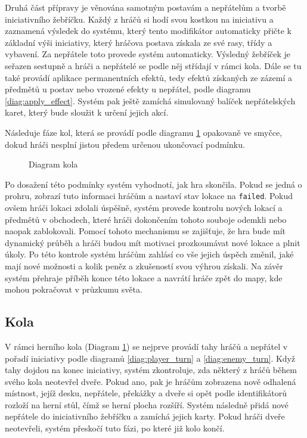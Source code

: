 Druhá část přípravy je věnována samotným postavám a nepřátelům a tvorbě iniciativního žebříčku. Každý z hráčů si hodí svou kostkou na iniciativu a zaznamená výsledek do systému, který tento modifikátor automaticky přičte k základní výši iniciativy, který hráčova postava získala ze své rasy, třídy a vybavení. Za nepřátele toto provede systém automaticky. Výsledný žebříček je seřazen sestupně a hráči a nepřátelé se podle něj střídají v rámci kola. Dále se tu také provádí aplikace permanentních efektů, tedy efektů získaných ze zázemí a předmětů u postav nebo vrozené efekty u nepřátel, podle diagramu \ref{diag:apply_effect}. Systém pak ještě zamíchá simulovaný balíček nepřátelských karet, který bude sloužit k určení jejich akcí.

Následuje fáze kol, která se provádí podle diagramu \ref{diag:round} opakovaně ve smyčce, dokud hráči nesplní jistou předem určenou ukončovací podmínku.

\begin{figure}[h]
    \centering
    \caption{Diagram kola}
    \label{diag:round}
\end{figure}

Po dosažení této podmínky systém vyhodnotí, jak hra skončila. Pokud se jedná o prohru, zobrazí tuto informaci hráčům a nastaví stav lokace na \texttt{failed}. Pokud ovšem hráči lokaci zdolali úspěšně, systém provede kontrolu nových lokací a předmětů v obchodech, které hráči dokončením tohoto souboje odemkli nebo naopak zablokovali. Pomocí tohoto mechanismu se zajišťuje, že hra bude mít dynamický průběh a hráči budou mít motivaci prozkoumávat nové lokace a plnit úkoly. Po této kontrole systém hráčům zahlásí co vše jejich úspěch změnil, jaké mají nové možnosti a kolik peněz a zkušeností svou výhrou získali. Na závěr systém přehraje příběh konce této lokace a navrátí hráče zpět do mapy, kde mohou pokračovat v průzkumu světa.


\subsection{Kola}
\label{subsec:design_rounds}

V rámci herního kola (Diagram \ref{diag:round}) se nejprve provádí tahy hráčů a nepřátel v pořadí iniciativy podle diagramů \ref{diag:player_turn} a \ref{diag:enemy_turn}. Když tahy dojdou na konec iniciativy, systém zkontroluje, zda některý z hráčů během svého kola neotevřel dveře. Pokud ano, pak je hráčům zobrazena nově odhalená místnost, jejíž desku, nepřátele, překážky a dveře si opět podle identifikátorů rozloží na herní stůl, čímž se herní plocha rozšíří. Systém následně přidá nové nepřátele do iniciativního žebříčku a zamíchá jejich karty. Pokud hráči dveře neotevřeli, systém přeskočí tuto fázi, po které již kolo končí.


